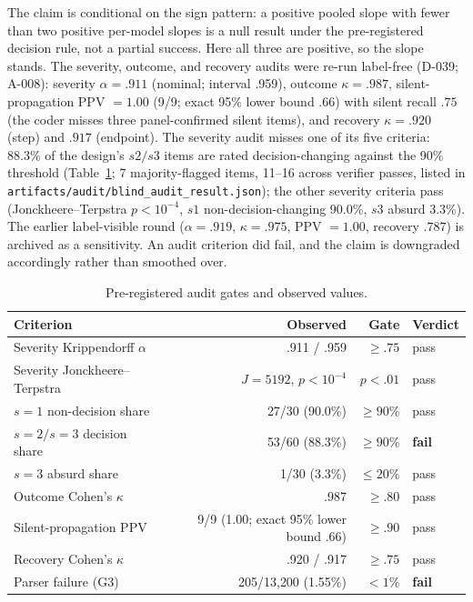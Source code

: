 \documentclass[a4paper,fleqn]{cas-sc}
\begin{document}
The claim is conditional on the sign pattern: a positive pooled slope with fewer than two
positive per-model slopes is a null result under the pre-registered decision rule, not a partial
success. Here all three are positive, so the slope stands. The severity, outcome, and recovery
audits were re-run label-free (D-039; A-008): severity $\alpha = .911$ (nominal; interval .959),
outcome $\kappa = .987$, silent-propagation PPV $= 1.00$ (9/9; exact 95\% lower bound .66) with
silent recall $.75$ (the coder misses three panel-confirmed silent items), and recovery
$\kappa = .920$ (step) and $.917$ (endpoint). The severity audit misses one of its five criteria: 88.3\% of
the design's $s2/s3$ items are rated decision-changing against the 90\% threshold (Table~\ref{tab:audit}; 7 majority-flagged items, 11--16 across verifier passes,
listed in \texttt{artifacts/audit/blind\_audit\_result.json}); the other severity criteria pass
(Jonckheere--Terpstra $p<10^{-4}$, $s1$ non-decision-changing 90.0\%, $s3$ absurd 3.3\%). The
earlier label-visible round ($\alpha = .919$, $\kappa = .975$, PPV $= 1.00$, recovery $.787$) is
archived as a sensitivity. An audit criterion did fail, and the claim is downgraded accordingly
rather than smoothed over.

\begin{table}[pos=htbp]
  \centering
  \caption{Pre-registered audit gates and observed values.}
  \label{tab:audit}
  \small
  \begin{tabular}{lrrl}
    \toprule
    \textbf{Criterion} & \textbf{Observed} & \textbf{Gate} & \textbf{Verdict} \\
    \midrule
    Severity Krippendorff $\alpha$ & .911 / .959 & $\ge .75$ & pass \\
    Severity Jonckheere--Terpstra & $J=5192$, $p<10^{-4}$ & $p<.01$ & pass \\
    $s=1$ non-decision share & 27/30 (90.0\%) & $\ge 90\%$ & pass \\
    $s=2/s=3$ decision share & 53/60 (88.3\%) & $\ge 90\%$ & \textbf{fail} \\
    $s=3$ absurd share & 1/30 (3.3\%) & $\le 20\%$ & pass \\
    Outcome Cohen's $\kappa$ & .987 & $\ge .80$ & pass \\
    Silent-propagation PPV & 9/9 (1.00; exact 95\% lower bound .66) & $\ge .90$ & pass \\
    Recovery Cohen's $\kappa$ & .920 / .917 & $\ge .75$ & pass \\
    Parser failure (G3) & 205/13{,}200 (1.55\%) & $<1\%$ & \textbf{fail} \\
    \bottomrule
  \end{tabular}
\end{table}
\end{document}
